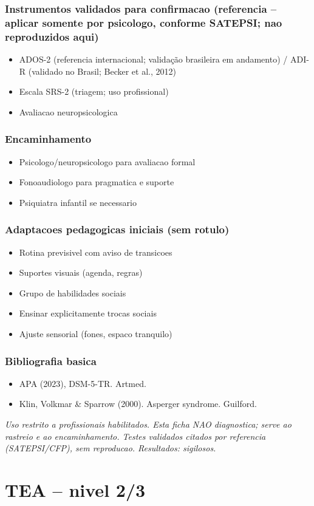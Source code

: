 \documentclass[a4paper,11pt]{book}
\newcommand{\avisolegal}{\par\medskip\noindent\footnotesize\itshape
\color{cinza}Uso restrito a profissionais habilitados. Esta ficha NAO diagnostica;
serve ao rastreio e ao encaminhamento. Testes validados citados por referencia
(SATEPSI/CFP), sem reproducao. Resultados: sigilosos.\color{black}\par}
\begin{document}
\subsection*{Instrumentos validados para confirmacao (referencia -- aplicar somente por psicologo, conforme SATEPSI; nao reproduzidos aqui)}
\begin{itemize}
\item ADOS-2 (referencia internacional; validação brasileira em andamento) / ADI-R (validado no Brasil; Becker et al., 2012)
\item Escala SRS-2 (triagem; uso profissional)
\item Avaliacao neuropsicologica
\end{itemize}
\subsection*{Encaminhamento}
\begin{itemize}
\item Psicologo/neuropsicologo para avaliacao formal
\item Fonoaudiologo para pragmatica e suporte
\item Psiquiatra infantil se necessario
\end{itemize}
\subsection*{Adaptacoes pedagogicas iniciais (sem rotulo)}
\begin{itemize}
\item Rotina previsivel com aviso de transicoes
\item Suportes visuais (agenda, regras)
\item Grupo de habilidades sociais
\item Ensinar explicitamente trocas sociais
\item Ajuste sensorial (fones, espaco tranquilo)
\end{itemize}
\subsection*{Bibliografia basica}
\begin{itemize}
\item APA (2023), DSM-5-TR. Artmed.
\item Klin, Volkmar \& Sparrow (2000). Asperger syndrome. Guilford.
\end{itemize}
\avisolegal


\chapter{TEA -- nivel 2/3}
\end{document}
